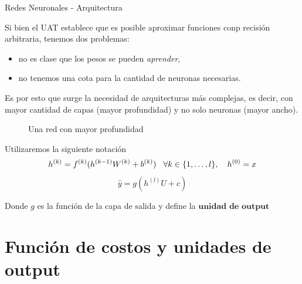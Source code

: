 \documentclass[handout, 9pt]{beamer}
\begin{document}
\begin{frame}{Redes Neuronales - Arquitectura}

Si bien el UAT establece que es posible aproximar funciones conp recisión arbitraria, tenemos dos problemas: 
\begin{itemize}
\item no es clase que los pesos se pueden \emph{aprender}, 
\item no tenemos una cota para la cantidad de neuronas necesarias.
\end{itemize} 
Es por esto que surge la necesidad de arquitecturas más complejas, es decir, con mayor cantidad de capas (mayor profundidad) y no solo neuronas (mayor ancho). \pause

\begin{figure}[H]
  \centering
  \caption{Una red con mayor profundidad}
\end{figure}

\pause 

Utilizaremos la siguiente notación 
\begin{equation}
h^{(k)} = f^{(k)}(h^{(k-1)}W^{(k)} + b^{(k)}) \hspace{0.3cm} \forall k \in \{1 ,\dots, l\}, \quad h^{(0)}=x
\end{equation}
\begin{equation}
\hat{y} = g(h^{(l)}U + c)
\end{equation}

Donde $g$ es la función de la capa de salida y define la $\textbf{unidad de output}$

\end{frame}

\section{Función de costos y unidades de output}
\end{document}
